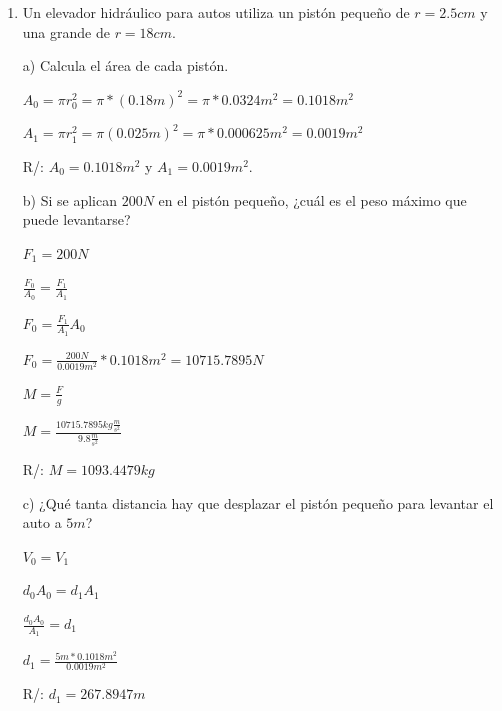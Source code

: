 \documentclass[a4paper, 11pt]{article}
\newcommand{\Pspace}{0.5cm}
\newcommand{\Aspace}{0.2cm}
\begin{document}
\begin{enumerate}
        \vspace{\Pspace}
        \item Un elevador hidráulico para autos utiliza un pistón pequeño de $r = 2.5cm$ y una grande de $r = 18cm$. \par
            \vspace{\Aspace} \par
            a) Calcula el área de cada pistón.
            \\ { \color{azul} 
                $A_0 = \pi r_0^2 = \pi * (0.18m)^2 = \pi * 0.0324m^2 = 0.1018m^2$
                \par $A_1 = \pi r_1^2 = \pi (0.025m)^2 = \pi * 0.000625m^2 = 0.0019m^2$
                \par R/: $A_0 = 0.1018m^2$ y $A_1 = 0.0019m^2$.
            }

            \newpage
            b) Si se aplican $200N$ en el pistón pequeño, ¿cuál es el peso máximo que puede levantarse?
            \\ { \color{azul} 
                $F_1 = 200N$
                \par $\frac{F_0}{A_0} = \frac{F_1}{A_1}$
                \par $F_0 = \frac{F_1}{A_1} A_0$
                \par $F_0 = \frac{200N}{0.0019m^2} * 0.1018m^2 = 10715.7895N$
                \par $M = \frac{F}{g}$
                \par $M = \frac{10715.7895kg\frac{m}{s^2}}{9.8\frac{m}{s^2}}$
                \par R/: $M = 1093.4479kg$
            }

            \vspace{\Aspace} \par
            c) ¿Qué tanta distancia hay que desplazar el pistón pequeño para levantar el auto a $5m$?
            \\ { \color{azul} 
                $V_0 = V_1$
                \par $d_0A_0 = d_1A_1$
                \par $\frac{d_0A_0}{A_1} = d_1$
                \par $d_1 = \frac{5m * 0.1018m^2}{0.0019m^2}$
                \par R/: $d_1 = 267.8947m$
            }
    \end{enumerate}
\end{document}
